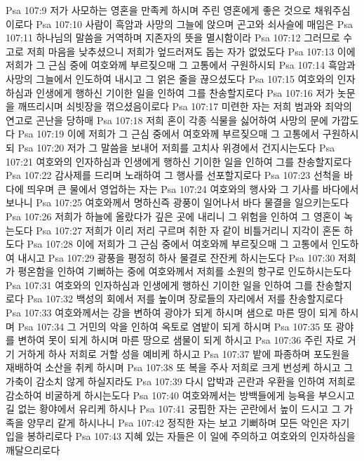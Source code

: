 Psa 107:9  저가 사모하는 영혼을 만족케 하시며 주린 영혼에게 좋은 것으로 채워주심이로다
Psa 107:10  사람이 흑암과 사망의 그늘에 앉으며 곤고와 쇠사슬에 매임은
Psa 107:11  하나님의 말씀을 거역하며 지존자의 뜻을 멸시함이라
Psa 107:12  그러므로 수고로 저희 마음을 낮추셨으니 저희가 엎드러져도 돕는 자가 없었도다
Psa 107:13  이에 저희가 그 근심 중에 여호와께 부르짖으매 그 고통에서 구원하시되
Psa 107:14  흑암과 사망의 그늘에서 인도하여 내시고 그 얽은 줄을 끊으셨도다
Psa 107:15  여호와의 인자하심과 인생에게 행하신 기이한 일을 인하여 그를 찬송할지로다
Psa 107:16  저가 놋문을 깨뜨리시며 쇠빗장을 꺾으셨음이로다
Psa 107:17  미련한 자는 저희 범과와 죄악의 연고로 곤난을 당하매
Psa 107:18  저희 혼이 각종 식물을 싫어하여 사망의 문에 가깝도다
Psa 107:19  이에 저희가 그 근심 중에서 여호와께 부르짖으매 그 고통에서 구원하시되
Psa 107:20  저가 그 말씀을 보내어 저희를 고치사 위경에서 건지시는도다
Psa 107:21  여호와의 인자하심과 인생에게 행하신 기이한 일을 인하여 그를 찬송할지로다
Psa 107:22  감사제를 드리며 노래하여 그 행사를 선포할지로다
Psa 107:23  선척을 바다에 띄우며 큰 물에서 영업하는 자는
Psa 107:24  여호와의 행사와 그 기사를 바다에서 보나니
Psa 107:25  여호와께서 명하신즉 광풍이 일어나서 바다 물결을 일으키는도다
Psa 107:26  저희가 하늘에 올랐다가 깊은 곳에 내리니 그 위험을 인하여 그 영혼이 녹는도다
Psa 107:27  저희가 이리 저리 구르며 취한 자 같이 비틀거리니 지각이 혼돈 하도다
Psa 107:28  이에 저희가 그 근심 중에서 여호와께 부르짖으매 그 고통에서 인도하여 내시고
Psa 107:29  광풍을 평정히 하사 물결로 잔잔케 하시는도다
Psa 107:30  저희가 평온함을 인하여 기뻐하는 중에 여호와께서 저희를 소원의 항구로 인도하시는도다
Psa 107:31  여호와의 인자하심과 인생에게 행하신 기이한 일을 인하여 그를 찬송할지로다
Psa 107:32  백성의 회에서 저를 높이며 장로들의 자리에서 저를 찬송할지로다
Psa 107:33  여호와께서는 강을 변하여 광야가 되게 하시며 샘으로 마른 땅이 되게 하시며
Psa 107:34  그 거민의 악을 인하여 옥토로 염밭이 되게 하시며
Psa 107:35  또 광야를 변하여 못이 되게 하시며 마른 땅으로 샘물이 되게 하시고
Psa 107:36  주린 자로 거기 거하게 하사 저희로 거할 성을 예비케 하시고
Psa 107:37  밭에 파종하며 포도원을 재배하여 소산을 취케 하시며
Psa 107:38  또 복을 주사 저희로 크게 번성케 하시고 그 가축이 감소치 않게 하실지라도
Psa 107:39  다시 압박과 곤란과 우환을 인하여 저희로 감소하여 비굴하게 하시는도다
Psa 107:40  여호와께서는 방백들에게 능욕을 부으시고 길 없는 황야에서 유리케 하시나
Psa 107:41  궁핍한 자는 곤란에서 높이 드시고 그 가족을 양무리 같게 하시나니
Psa 107:42  정직한 자는 보고 기뻐하며 모든 악인은 자기 입을 봉하리로다
Psa 107:43  지혜 있는 자들은 이 일에 주의하고 여호와의 인자하심을 깨달으리로다
